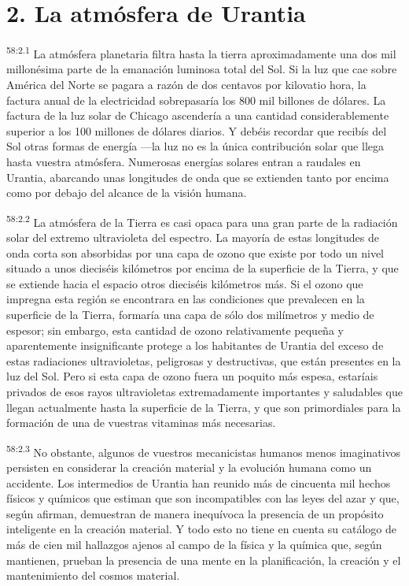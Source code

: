 \section*{2. La atmósfera de Urantia}
\par
\textsuperscript{58:2.1} La atmósfera planetaria filtra hasta la tierra aproximadamente una dos mil millonésima parte de la emanación luminosa total del Sol. Si la luz que cae sobre América del Norte se pagara a razón de dos centavos por kilovatio hora, la factura anual de la electricidad sobrepasaría los 800 mil billones de dólares. La factura de la luz solar de Chicago ascendería a una cantidad considerablemente superior a los 100 millones de dólares diarios. Y debéis recordar que recibís del Sol otras formas de energía ---la luz no es la única contribución solar que llega hasta vuestra atmósfera. Numerosas energías solares entran a raudales en Urantia, abarcando unas longitudes de onda que se extienden tanto por encima como por debajo del alcance de la visión humana.

\par
\textsuperscript{58:2.2} La atmósfera de la Tierra es casi opaca para una gran parte de la radiación solar del extremo ultravioleta del espectro. La mayoría de estas longitudes de onda corta son absorbidas por una capa de ozono que existe por todo un nivel situado a unos dieciséis kilómetros por encima de la superficie de la Tierra, y que se extiende hacia el espacio otros dieciséis kilómetros más. Si el ozono que impregna esta región se encontrara en las condiciones que prevalecen en la superficie de la Tierra, formaría una capa de sólo dos milímetros y medio de espesor; sin embargo, esta cantidad de ozono relativamente pequeña y aparentemente insignificante protege a los habitantes de Urantia del exceso de estas radiaciones ultravioletas, peligrosas y destructivas, que están presentes en la luz del Sol. Pero si esta capa de ozono fuera un poquito más espesa, estaríais privados de esos rayos ultravioletas extremadamente importantes y saludables que llegan actualmente hasta la superficie de la Tierra, y que son primordiales para la formación de una de vuestras vitaminas más necesarias.

\par
\textsuperscript{58:2.3} No obstante, algunos de vuestros mecanicistas humanos menos imaginativos persisten en considerar la creación material y la evolución humana como un accidente. Los intermedios de Urantia han reunido más de cincuenta mil hechos físicos y químicos que estiman que son incompatibles con las leyes del azar y que, según afirman, demuestran de manera inequívoca la presencia de un propósito inteligente en la creación material. Y todo esto no tiene en cuenta su catálogo de más de cien mil hallazgos ajenos al campo de la física y la química que, según mantienen, prueban la presencia de una mente en la planificación, la creación y el mantenimiento del cosmos material.

